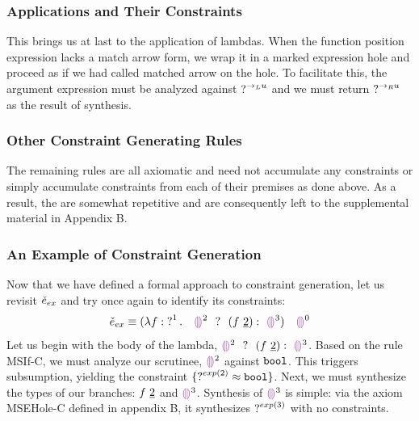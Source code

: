 \subsubsection{Applications and Their Constraints}
This brings us at last to the application of lambdas. When the function position expression lacks a match arrow form, we wrap it in a marked expression hole and proceed as if we had called matched arrow on the hole. To facilitate this, the argument expression must be analyzed against $\TUnknown^{\rightarrow_L{u}}$ and we must return $\TUnknown^{\rightarrow_R{u}}$ as the result of synthesis. 


\begin{mathpar}
\end{mathpar}

\subsubsection{Other Constraint Generating Rules}
The remaining rules are all axiomatic and need not accumulate any constraints or simply accumulate constraints from each of their premises as done above. As a result, the are somewhat repetitive and are consequently left to the supplemental material in Appendix B.

\subsubsection{An Example of Constraint Generation}
Now that we have defined a formal approach to constraint generation, let us revisit $\ECMV_{ex}$ and try once again to identify its constraints:
$$\ECMV_{ex} \equiv \ECAp{(\ECLam{f}{\TUnknown^1}{~~\ECIf{\EEHole^2~}{~(\ECAp{f}{\underline{2}})}{~\EEHole^3}})}{~~\EEHole^0}$$
Let us begin with the body of the lambda, $\ECIf{\EEHole^2~}{~(\ECAp{f}{\underline{2}})}{~\EEHole^3}$. Based on the rule MSIf-C, we must analyze our scrutinee, $\EEHole^2$ against $\tbool$. This triggers subsumption, yielding the constraint $\{ \TUnknown^{exp(2)} \approx \tbool \}$. Next, we must synthesize the types of our branches: $\ECAp{f}{\underline{2}}$ and $\EEHole^3$. Synthesis of $\EEHole^3$ is simple: via the axiom MSEHole-C defined in appendix B, it synthesizes $\TUnknown^{exp(3)}$ with no constraints.

